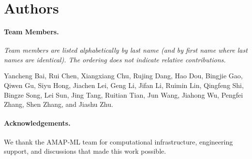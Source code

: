\section*{Authors}

\paragraph{Team Members.}
\emph{Team members are listed alphabetically by last name (and by first name
where last names are identical). The ordering does not indicate relative
contributions.}

Yancheng Bai, Rui Chen, Xiangxiang Chu, Rujing Dang, Hao Dou, Bingjie Gao, Qiwen Gu, Siyu Hong,
Jiachen Lei, Geng Li, Jifan Li, Ruimin Lin, Qingfeng Shi, Bingze Song,
Lei Sun, Jing Tang, Ruitian Tian, Jun Wang, Jiahong Wu, Pengfei Zhang,
Shen Zhang, and Jiashu Zhu.

\paragraph{Acknowledgements.}
We thank the AMAP-ML team for computational infrastructure, engineering support,
and discussions that made this work possible.
